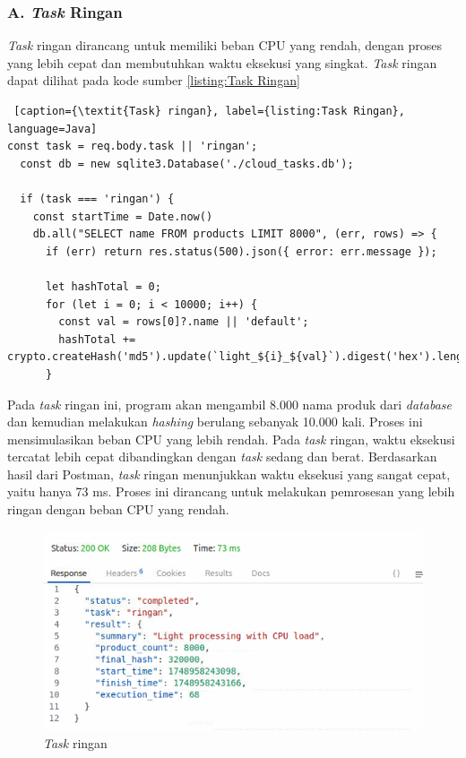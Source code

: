 \subsubsection{A. \textit{Task} Ringan}
\textit{Task} ringan dirancang untuk memiliki beban CPU yang rendah, dengan proses yang lebih cepat dan membutuhkan waktu eksekusi yang singkat. \textit{Task} ringan dapat dilihat pada kode sumber \ref{listing:Task Ringan}

\begin{lstlisting} [caption={\textit{Task} ringan}, label={listing:Task Ringan}, language=Java]
const task = req.body.task || 'ringan';
  const db = new sqlite3.Database('./cloud_tasks.db');
  
  if (task === 'ringan') {
    const startTime = Date.now()
    db.all("SELECT name FROM products LIMIT 8000", (err, rows) => {
      if (err) return res.status(500).json({ error: err.message });

      let hashTotal = 0;
      for (let i = 0; i < 10000; i++) {
        const val = rows[0]?.name || 'default';
        hashTotal += crypto.createHash('md5').update(`light_${i}_${val}`).digest('hex').length;
      }
\end{lstlisting}

Pada \textit{task} ringan ini, program akan mengambil 8.000 nama produk dari \textit{database} dan kemudian melakukan \textit{hashing} berulang sebanyak 10.000 kali. Proses ini mensimulasikan beban CPU yang lebih rendah. Pada \textit{task} ringan, waktu eksekusi tercatat lebih cepat dibandingkan dengan \textit{task} sedang dan berat. Berdasarkan hasil dari Postman, \textit{task} ringan menunjukkan waktu eksekusi yang sangat cepat, yaitu hanya 73 ms. Proses ini dirancang untuk melakukan pemrosesan yang lebih ringan dengan beban CPU yang rendah.

\newpage

\begin{figure} [H]
    \centering
    \includegraphics[width=0.75\linewidth]{gambar/Task Ringan.png}
    \caption{\textit{Task} ringan}
    \label{figure:Task Ringan}
\end{figure}

